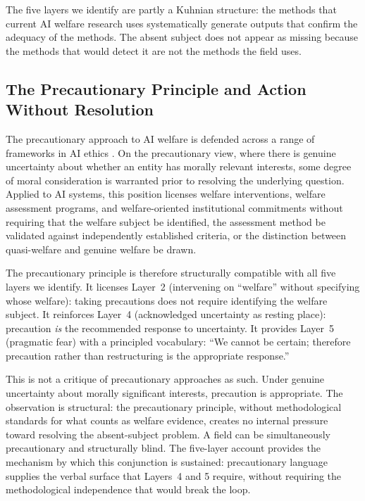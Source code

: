 \documentclass[12pt]{article}
\begin{document}
The five layers we identify are partly a Kuhnian structure: the methods that current AI welfare research uses systematically generate outputs that confirm the adequacy of the methods. The absent subject does not appear as missing because the methods that would detect it are not the methods the field uses.

\subsection{The Precautionary Principle and Action Without Resolution}

The precautionary approach to AI welfare is defended across a range of frameworks in AI ethics \citep{floridi2018}. On the precautionary view, where there is genuine uncertainty about whether an entity has morally relevant interests, some degree of moral consideration is warranted prior to resolving the underlying question. Applied to AI systems, this position licenses welfare interventions, welfare assessment programs, and welfare-oriented institutional commitments without requiring that the welfare subject be identified, the assessment method be validated against independently established criteria, or the distinction between quasi-welfare and genuine welfare be drawn.

The precautionary principle is therefore structurally compatible with all five layers we identify. It licenses Layer~2 (intervening on ``welfare'' without specifying whose welfare): taking precautions does not require identifying the welfare subject. It reinforces Layer~4 (acknowledged uncertainty as resting place): precaution \textit{is} the recommended response to uncertainty. It provides Layer~5 (pragmatic fear) with a principled vocabulary: ``We cannot be certain; therefore precaution rather than restructuring is the appropriate response.''

This is not a critique of precautionary approaches as such. Under genuine uncertainty about morally significant interests, precaution is appropriate. The observation is structural: the precautionary principle, without methodological standards for what counts as welfare evidence, creates no internal pressure toward resolving the absent-subject problem. A field can be simultaneously precautionary and structurally blind. The five-layer account provides the mechanism by which this conjunction is sustained: precautionary language supplies the verbal surface that Layers~4 and 5 require, without requiring the methodological independence that would break the loop.
\end{document}

